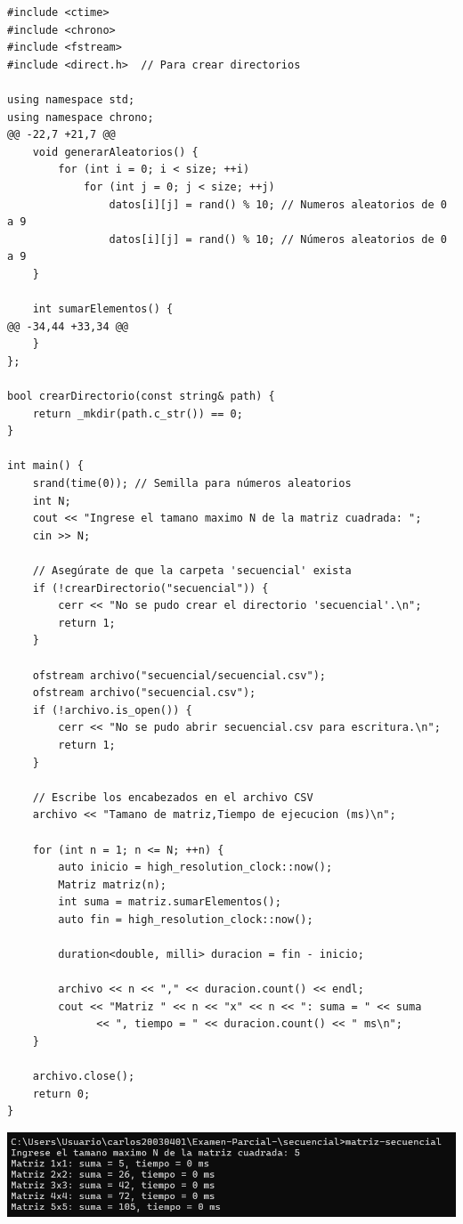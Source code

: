\documentclass{article}
\begin{document}
  	\begin{lstlisting}
#include <ctime>
#include <chrono>
#include <fstream>
#include <direct.h>  // Para crear directorios

using namespace std;
using namespace chrono;
@@ -22,7 +21,7 @@
    void generarAleatorios() {
        for (int i = 0; i < size; ++i)
            for (int j = 0; j < size; ++j)
                datos[i][j] = rand() % 10; // Numeros aleatorios de 0 a 9
                datos[i][j] = rand() % 10; // Números aleatorios de 0 a 9
    }

    int sumarElementos() {
@@ -34,44 +33,34 @@
    }
};

bool crearDirectorio(const string& path) {
    return _mkdir(path.c_str()) == 0;
}

int main() {
    srand(time(0)); // Semilla para números aleatorios
    int N;
    cout << "Ingrese el tamano maximo N de la matriz cuadrada: ";
    cin >> N;

    // Asegúrate de que la carpeta 'secuencial' exista
    if (!crearDirectorio("secuencial")) {
        cerr << "No se pudo crear el directorio 'secuencial'.\n";
        return 1;
    }

    ofstream archivo("secuencial/secuencial.csv");
    ofstream archivo("secuencial.csv");
    if (!archivo.is_open()) {
        cerr << "No se pudo abrir secuencial.csv para escritura.\n";
        return 1;
    }

    // Escribe los encabezados en el archivo CSV
    archivo << "Tamano de matriz,Tiempo de ejecucion (ms)\n";

    for (int n = 1; n <= N; ++n) {
        auto inicio = high_resolution_clock::now();
        Matriz matriz(n);
        int suma = matriz.sumarElementos();
        auto fin = high_resolution_clock::now();

        duration<double, milli> duracion = fin - inicio;

        archivo << n << "," << duracion.count() << endl;
        cout << "Matriz " << n << "x" << n << ": suma = " << suma
              << ", tiempo = " << duracion.count() << " ms\n";
    }

    archivo.close();
    return 0;
}
	\end{lstlisting}
        \includegraphics[width=1\textwidth]{img/resultado_1.png}        
\end{document}

